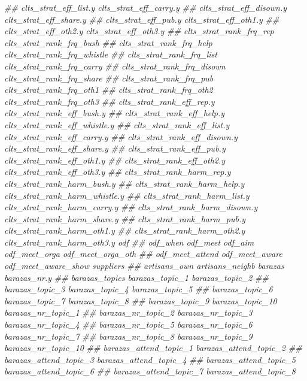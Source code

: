 \documentclass[
]{article}
\newenvironment{Shaded}{\begin{snugshade}}{\end{snugshade}}
\newcommand{\CommentTok}[1]{\textcolor[rgb]{0.56,0.35,0.01}{\textit{#1}}}
\begin{document}
\begin{Shaded}
\begin{Highlighting}[]
\CommentTok{##      clts_strat_eff_list.y clts_strat_eff_carry.y}
\CommentTok{##      clts_strat_eff_disown.y clts_strat_eff_share.y}
\CommentTok{##      clts_strat_eff_pub.y clts_strat_eff_oth1.y}
\CommentTok{##      clts_strat_eff_oth2.y clts_strat_eff_oth3.y}
\CommentTok{##      clts_strat_rank_frq_rep clts_strat_rank_frq_bush}
\CommentTok{##      clts_strat_rank_frq_help clts_strat_rank_frq_whistle}
\CommentTok{##      clts_strat_rank_frq_list clts_strat_rank_frq_carry}
\CommentTok{##      clts_strat_rank_frq_disown clts_strat_rank_frq_share}
\CommentTok{##      clts_strat_rank_frq_pub clts_strat_rank_frq_oth1}
\CommentTok{##      clts_strat_rank_frq_oth2 clts_strat_rank_frq_oth3}
\CommentTok{##      clts_strat_rank_eff_rep.y clts_strat_rank_eff_bush.y}
\CommentTok{##      clts_strat_rank_eff_help.y clts_strat_rank_eff_whistle.y}
\CommentTok{##      clts_strat_rank_eff_list.y clts_strat_rank_eff_carry.y}
\CommentTok{##      clts_strat_rank_eff_disown.y clts_strat_rank_eff_share.y}
\CommentTok{##      clts_strat_rank_eff_pub.y clts_strat_rank_eff_oth1.y}
\CommentTok{##      clts_strat_rank_eff_oth2.y clts_strat_rank_eff_oth3.y}
\CommentTok{##      clts_strat_rank_harm_rep.y clts_strat_rank_harm_bush.y}
\CommentTok{##      clts_strat_rank_harm_help.y clts_strat_rank_harm_whistle.y}
\CommentTok{##      clts_strat_rank_harm_list.y clts_strat_rank_harm_carry.y}
\CommentTok{##      clts_strat_rank_harm_disown.y clts_strat_rank_harm_share.y}
\CommentTok{##      clts_strat_rank_harm_pub.y clts_strat_rank_harm_oth1.y}
\CommentTok{##      clts_strat_rank_harm_oth2.y clts_strat_rank_harm_oth3.y odf}
\CommentTok{##      odf_when odf_meet odf_aim odf_meet_orga odf_meet_orga_oth}
\CommentTok{##      odf_meet_attend odf_meet_aware odf_meet_aware_show suppliers}
\CommentTok{##      artisans_own artisans_neighb barazas barazas_nr.y}
\CommentTok{##      barazas_topics barazas_topic_1 barazas_topic_2}
\CommentTok{##      barazas_topic_3 barazas_topic_4 barazas_topic_5}
\CommentTok{##      barazas_topic_6 barazas_topic_7 barazas_topic_8}
\CommentTok{##      barazas_topic_9 barazas_topic_10 barazas_nr_topic_1}
\CommentTok{##      barazas_nr_topic_2 barazas_nr_topic_3 barazas_nr_topic_4}
\CommentTok{##      barazas_nr_topic_5 barazas_nr_topic_6 barazas_nr_topic_7}
\CommentTok{##      barazas_nr_topic_8 barazas_nr_topic_9 barazas_nr_topic_10}
\CommentTok{##      barazas_attend_topic_1 barazas_attend_topic_2}
\CommentTok{##      barazas_attend_topic_3 barazas_attend_topic_4}
\CommentTok{##      barazas_attend_topic_5 barazas_attend_topic_6}
\CommentTok{##      barazas_attend_topic_7 barazas_attend_topic_8}

\end{Highlighting}
\end{Shaded}
\end{document}
